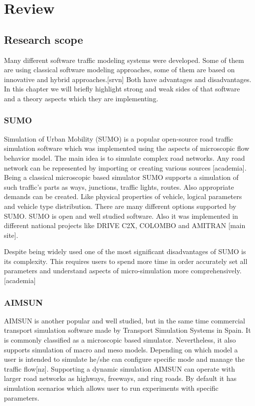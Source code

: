 \begin{itemize}
\begin{itemize}
	\end{itemize}
\end{itemize}

\section{Review}

\subsection{Research scope}

Many different software traffic modeling systems were developed.
Some of them are using classical software modeling approaches, some of them are based on innovative and hybrid approaches.[srvn]
Both have advantages and disadvantages.
In this chapter we will briefly highlight strong and weak sides of that software  and a theory  aspects which they are implementing.


\subsubsection{SUMO}

Simulation of Urban Mobility (SUMO) is a popular open-source road traffic simulation software which was implemented using the aspects of microscopic flow behavior model.
The main idea is to simulate complex road networks. Any road network can be represented by importing or creating various sources [academia].
Being a classical microscopic based simulator SUMO supports a simulation of such traffic's parts as ways, junctions, traffic lights, routes.
Also appropriate demands can be created. Like physical properties of vehicle, logical parameters and vehicle type distribution.
There are many different options supported by SUMO.
SUMO is open and well studied software. Also it was implemented in different national projects like DRIVE C2X, COLOMBO and AMITRAN [main site].

Despite being widely used one of the most significant disadvantages of SUMO is its complexity.
This requires users to spend more time in order accurately set
all parameters and understand aspects of micro-simulation more comprehensively. [academia]

\subsubsection{AIMSUN}

AIMSUN is another popular and well studied, but in the same time commercial
transport simulation software made by Transport Simulation Systems in Spain.
It is commonly classified as a microscopic based simulator.
Nevertheless, it also supports simulation of macro and meso models.
Depending on which model a user is intended to simulate he/she can configure specific mode and manage the traffic flow[nz].
Supporting a dynamic simulation AIMSUN can operate with larger road networks as highways, freeways, and ring roads.
By default it has simulation scenarios which allows user to run experiments with specific parameters.

